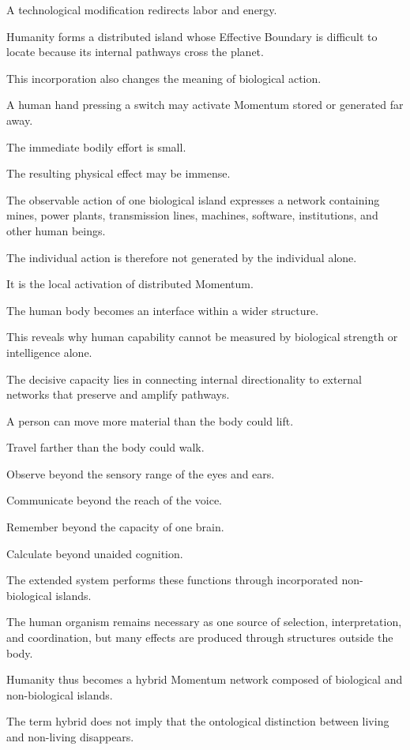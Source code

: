 A technological modification redirects labor and energy.

Humanity forms a distributed island whose Effective Boundary is difficult to locate because its internal pathways cross the planet.

This incorporation also changes the meaning of biological action.

A human hand pressing a switch may activate Momentum stored or generated far away.

The immediate bodily effort is small.

The resulting physical effect may be immense.

The observable action of one biological island expresses a network containing mines, power plants, transmission lines, machines, software, institutions, and other human beings.

The individual action is therefore not generated by the individual alone.

It is the local activation of distributed Momentum.

The human body becomes an interface within a wider structure.

This reveals why human capability cannot be measured by biological strength or intelligence alone.

The decisive capacity lies in connecting internal directionality to external networks that preserve and amplify pathways.

A person can move more material than the body could lift.

Travel farther than the body could walk.

Observe beyond the sensory range of the eyes and ears.

Communicate beyond the reach of the voice.

Remember beyond the capacity of one brain.

Calculate beyond unaided cognition.

The extended system performs these functions through incorporated non-biological islands.

The human organism remains necessary as one source of selection, interpretation, and coordination, but many effects are produced through structures outside the body.

Humanity thus becomes a hybrid Momentum network composed of biological and non-biological islands.

The term hybrid does not imply that the ontological distinction between living and non-living disappears.

